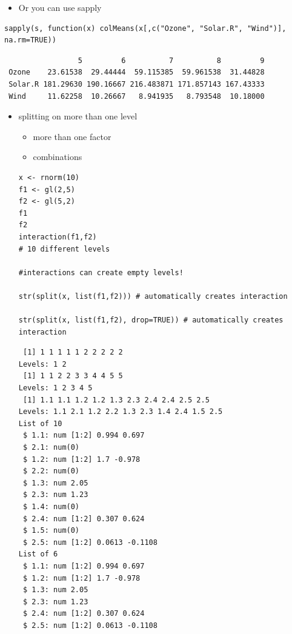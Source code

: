 \documentclass[11pt]{article}
\begin{document}
\begin{itemize}
\item Or you can use sapply
\end{itemize}

\begin{verbatim}
sapply(s, function(x) colMeans(x[,c("Ozone", "Solar.R", "Wind")], na.rm=TRUE))
\end{verbatim}

\begin{verbatim}
                 5         6          7          8         9
 Ozone    23.61538  29.44444  59.115385  59.961538  31.44828
 Solar.R 181.29630 190.16667 216.483871 171.857143 167.43333
 Wind     11.62258  10.26667   8.941935   8.793548  10.18000
\end{verbatim}
\begin{itemize}

\item splitting on more than one level\\
\label{sec-2-4-6-1}%
\begin{itemize}
\item more than one factor
\item combinations
\end{itemize}

\begin{verbatim}
x <- rnorm(10)
f1 <- gl(2,5)
f2 <- gl(5,2)
f1
f2
interaction(f1,f2)
# 10 different levels

#interactions can create empty levels!

str(split(x, list(f1,f2))) # automatically creates interaction

str(split(x, list(f1,f2), drop=TRUE)) # automatically creates interaction
\end{verbatim}


\begin{verbatim}
 [1] 1 1 1 1 1 2 2 2 2 2
Levels: 1 2
 [1] 1 1 2 2 3 3 4 4 5 5
Levels: 1 2 3 4 5
 [1] 1.1 1.1 1.2 1.2 1.3 2.3 2.4 2.4 2.5 2.5
Levels: 1.1 2.1 1.2 2.2 1.3 2.3 1.4 2.4 1.5 2.5
List of 10
 $ 1.1: num [1:2] 0.994 0.697
 $ 2.1: num(0) 
 $ 1.2: num [1:2] 1.7 -0.978
 $ 2.2: num(0) 
 $ 1.3: num 2.05
 $ 2.3: num 1.23
 $ 1.4: num(0) 
 $ 2.4: num [1:2] 0.307 0.624
 $ 1.5: num(0) 
 $ 2.5: num [1:2] 0.0613 -0.1108
List of 6
 $ 1.1: num [1:2] 0.994 0.697
 $ 1.2: num [1:2] 1.7 -0.978
 $ 1.3: num 2.05
 $ 2.3: num 1.23
 $ 2.4: num [1:2] 0.307 0.624
 $ 2.5: num [1:2] 0.0613 -0.1108
\end{verbatim}

\end{itemize} %
\end{document}
